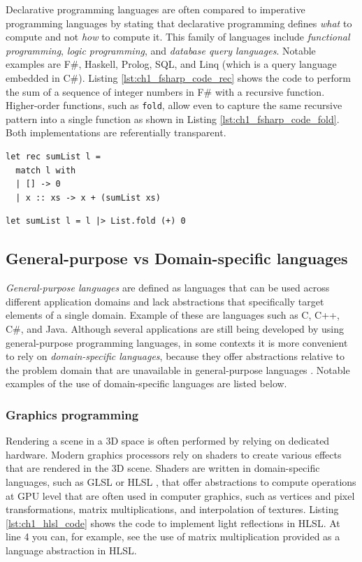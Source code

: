 Declarative programming languages are often compared to imperative programming languages by stating that declarative programming defines \textit{what} to compute and not \textit{how} to compute it. This family of languages include \textit{functional programming}, \textit{logic programming}, and \textit{database query languages}. Notable examples are F\#, Haskell, Prolog, SQL, and Linq (which is a query language embedded in C\#). Listing \ref{lst:ch1_fsharp_code_rec} shows the code to perform the sum of a sequence of integer numbers in F\# with a recursive function. Higher-order functions, such as \texttt{fold}, allow even to capture the same recursive pattern into a single function as shown in Listing \ref{lst:ch1_fsharp_code_fold}. Both implementations are referentially transparent.

\begin{lstlisting}[caption = Recursive F\# code to compute the sum of a sequence of numbers, label = lst:ch1_fsharp_code_rec]
let rec sumList l =
  match l with
  | [] -> 0
  | x :: xs -> x + (sumList xs)
\end{lstlisting}

\begin{lstlisting}[caption = F\# code to compute the sum of a sequence of numbers using higher-order functions, label = lst:ch1_fsharp_code_fold]
let sumList l = l |> List.fold (+) 0
\end{lstlisting}

\subsection{General-purpose vs Domain-specific languages}
\label{sec:ch1_dsl}
\textit{General-purpose languages} are defined as languages that can be used across different application domains and lack abstractions that specifically target elements of a single domain. Example of these are languages such as C, C++, C\#, and Java. Although several applications are still being developed by using general-purpose programming languages, in some contexts it is more convenient to rely on \textit{domain-specific languages}, because they offer abstractions relative to the problem domain that are unavailable in general-purpose languages \cite{van2000domain, voelter2013dsl}. Notable examples of the use of domain-specific languages are listed below.

\subsubsection*{Graphics programming}
Rendering a scene in a 3D space is often performed by relying on dedicated hardware. Modern graphics processors rely on shaders to create various effects that are rendered in the 3D scene. Shaders are written in domain-specific languages, such as GLSL or HLSL \cite{glhl2014, hlsl2018, hlslref2018}, that offer abstractions to compute operations at GPU level that are often used in computer graphics, such as vertices and pixel transformations, matrix multiplications, and interpolation of textures. Listing \ref{lst:ch1_hlsl_code} shows the code to implement light reflections in HLSL. At line 4 you can, for example, see the use of matrix multiplication provided as a language abstraction in HLSL.

